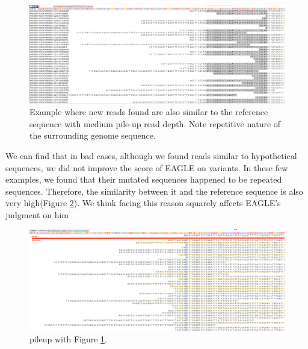 \begin{figure}[H]
    \centering
    \includegraphics[width=1\columnwidth]{body/image/4-8.png}
    \captionsetup{labelfont=bf}
    \renewcommand{\baselinestretch}{1.0}
    \vspace{-1cm}
    \caption[New reads are similar to the reference with medium pile-up read depth]{Example where new reads found are also similar to the reference sequence with medium pile-up read depth.  Note repetitive nature of the surrounding genome sequence.}
    \label{f4-8}
\end{figure}

We can find that in bad cases, although we found reads similar to hypothetical sequences, we did not improve the score of EAGLE on variants. In these few examples, we found that their mutated sequences happened to be repeated sequences. Therefore, the similarity between it and the reference sequence is also very high(Figure \ref{f4-9}). We think facing this reason squarely affects EAGLE's judgment on him

\vspace{1cm}
\begin{figure}[H]
    \centering
    \includegraphics[width=1\columnwidth]{body/image/4-9.png}
    \captionsetup{labelfont=bf}
    \renewcommand{\baselinestretch}{1.0}
    \vspace{-1cm}
    \caption[pileup with Figure \ref{f4-8}]{pileup with Figure \ref{f4-8}.}
    \label{f4-9}
\end{figure}


